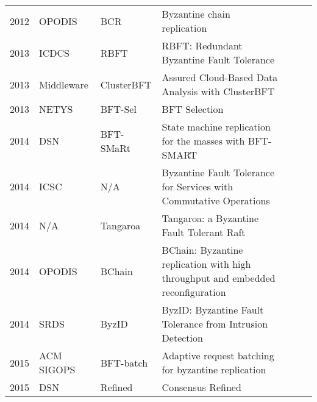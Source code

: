\documentclass{article}
\begin{document}
\begin{landscape}
\begin{longtable}[c]{llll|l|l|l|}
2012 & OPODIS            & BCR                     & Byzantine chain replication                                                               &            &          &              \\ \cline{5-7} 
2013 & ICDCS             & RBFT                    & RBFT: Redundant Byzantine Fault Tolerance                                                 &            &          &              \\ \cline{5-7} 
2013 & Middleware        & ClusterBFT              & Assured Cloud-Based Data Analysis with ClusterBFT                                         &            &          &              \\ \cline{5-7} 
2013 & NETYS             & BFT-Sel                 & BFT Selection                                                                             &            &          &              \\ \cline{5-7} 
2014 & DSN               & BFT-SMaRt               & State machine replication for the masses with BFT-SMART                                   &            &          &              \\ \cline{5-7} 
2014 & ICSC              & N/A                     & Byzantine Fault Tolerance for Services with Commutative Operations                        &            &          &              \\ \cline{5-7} 
2014 & N/A               & Tangaroa                & Tangaroa: a Byzantine Fault Tolerant Raft                                                 &            &          &              \\ \cline{5-7} 
2014 & OPODIS            & BChain                  & BChain: Byzantine replication with high throughput and embedded reconfiguration           &            &          &              \\ \cline{5-7} 
2014 & SRDS              & ByzID                   & ByzID: Byzantine Fault Tolerance from Intrusion Detection                                 &            &          &              \\ \cline{5-7} 
2015 & ACM SIGOPS        & BFT-batch               & Adaptive request batching for byzantine replication                                       &            &          &              \\ \cline{5-7} 
2015 & DSN               & Refined                 & Consensus Refined                                                                         &            &          &              \\ \cline{5-7} 

\end{longtable}
\end{landscape}
\end{document}

